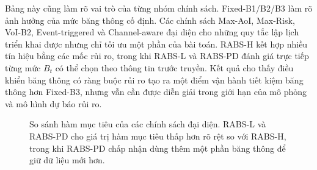 \documentclass[10pt]{article}
\begin{document}
\begin{table}[ht]
\centering
\caption{Kiểm định thứ hạng dấu Wilcoxon ghép cặp ($n=320$) giữa RABS-PD và các đối chứng. $\Delta$TB là sai khác trung bình (âm nghĩa là RABS-PD nhỏ hơn, tức tốt hơn với chỉ số cần cực tiểu), KTC 95\% theo phân phối $t$, $p$ đã hiệu chỉnh Holm--Bonferroni, $r$ là kích thước hiệu ứng.}
\label{tab:rabs_wilcoxon}
\resizebox{\linewidth}{!}{}
\end{table}

Bảng này cũng làm rõ vai trò của từng nhóm chính sách. Fixed-B1/B2/B3 làm rõ ảnh hưởng của mức băng thông cố định. Các chính sách Max-AoI, Max-Risk, VoI-B2, Event-triggered và Channel-aware đại diện cho những quy tắc lập lịch triển khai được nhưng chỉ tối ưu một phần của bài toán. RABS-H kết hợp nhiều tín hiệu bằng các mốc rủi ro, trong khi RABS-L và RABS-PD đánh giá trực tiếp từng mức $B_t$ có thể chọn theo thông tin trước truyền. Kết quả cho thấy điều khiển băng thông có ràng buộc rủi ro tạo ra một điểm vận hành tiết kiệm băng thông hơn Fixed-B3, nhưng vẫn cần được diễn giải trong giới hạn của mô phỏng và mô hình dự báo rủi ro.

\begin{figure}[ht]
\centering
{}
\caption{So sánh hàm mục tiêu của các chính sách đại diện. RABS-L và RABS-PD cho giá trị hàm mục tiêu thấp hơn rõ rệt so với RABS-H, trong khi RABS-PD chấp nhận dùng thêm một phần băng thông để giữ dữ liệu mới hơn.}
\label{fig:rabs_objective_burst}
\end{figure}
\end{document}

